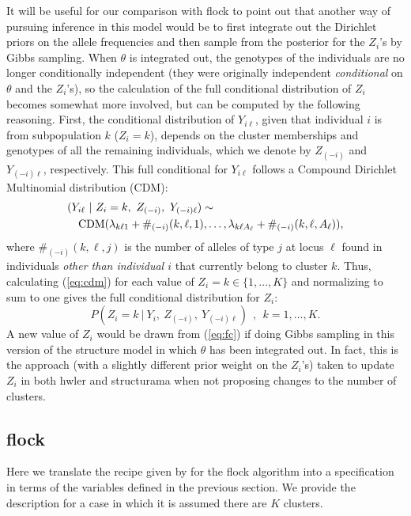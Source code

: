 It will be useful for our comparison with {\sc flock} to point out that another way 
of pursuing inference in this model would be to first integrate out the 
Dirichlet priors on the allele frequencies and then sample from the posterior
for the $Z_i$'s by Gibbs sampling.  When $\theta$ is integrated out, the genotypes 
of the individuals are no longer conditionally independent (they were originally
independent {\em conditional} on $\theta$ and the $Z_i$'s), so the calculation of 
the full conditional distribution of $Z_i$ becomes somewhat more involved,
but can be computed by the following reasoning. First, the 
conditional distribution of $Y_{i\ell}$, given that individual $i$ is from subpopulation $k$
(\ie $Z_i=k$), depends on the 
cluster memberships and genotypes  of all the remaining individuals,
which we denote by  $Z_{(-i)}$ and $Y_{(-i)\ell}$, respectively.
This full conditional for $Y_{i\ell}$ follows 
a Compound Dirichlet Multinomial distribution (CDM):
\begin{eqnarray}
\lefteqn{(Y_{i\ell}~|~Z_i=k,~Z_{(-i)},~Y_{(-i)\ell}) \sim} \label{eq:cdm}\\
& & \mathrm{CDM}(\lambda_{k\ell 1} + \#_{(-i)}(k,\ell,1), \ldots,
\lambda_{k\ell A_\ell} + \#_{(-i)}(k,\ell,A_\ell)), \nonumber
\end{eqnarray}
where $\#_{(-i)}(k,\ell,j)$ is the number of alleles of type $j$ at locus $\ell$
found in individuals {\em other than individual $i$} that currently
belong to cluster $k$. Thus, calculating (\ref{eq:cdm}) for each value of $Z_i=k \in 
\{1,\ldots,K\}$ 
and normalizing to sum to one gives the full conditional distribution for 
$Z_i$:
\begin{equation}
P(Z_i=k~|~Y_i, ~Z_{(-i)},~Y_{(-i)\ell})~~,~~k=1,\ldots,K.
\label{eq:fc}
\end{equation}
A new value of $Z_i$ would be drawn from (\ref{eq:fc}) if doing Gibbs sampling in this
version of the {\sc structure} model in which $\theta$ has been integrated out.  In 
fact,
this is the approach (with a slightly different prior weight on the $Z_i$'s) taken to 
update 
$Z_i$ in both {\sc hwler} \citep{Pel&Mas2006} and {\sc structurama} \citep{Hue&And2007} 
when not
proposing changes to the number of clusters.



\subsection*{{\sc flock}}
Here we translate the recipe given by \citeauthor{Duc&Tur2009} for the 
{\sc flock} algorithm into a specification in terms of the variables
defined in the previous section.  We provide the description for a case in which
it is assumed there are $K$ clusters.

